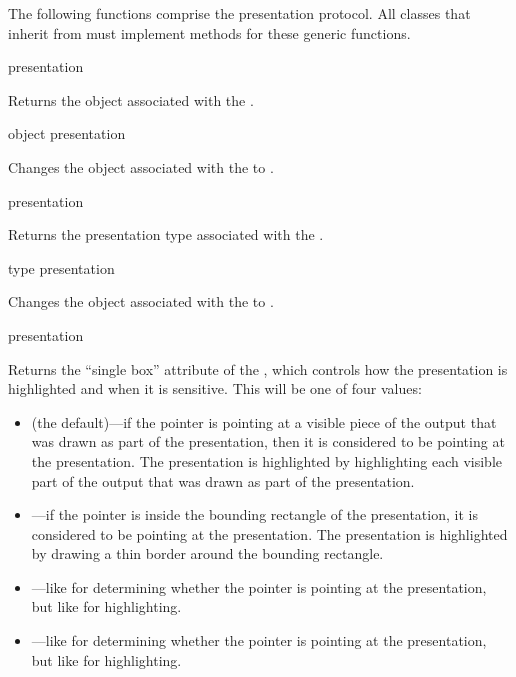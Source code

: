 The following functions comprise the presentation protocol.  All classes that
inherit from  must implement methods for these generic
functions.

 {presentation}

Returns the object associated with the  .

 {object presentation}

Changes the object associated with the   to
.

 {presentation}

Returns the presentation type associated with the 
.

 {type presentation}

Changes the object associated with the   to
.

 {presentation}

Returns the ``single box'' attribute of the 
, which controls how the presentation is highlighted and when
it is sensitive.  This will be one of four values:

\begin{itemize} 
\item {} (the default)---if the pointer is pointing at a visible piece of
the output that was drawn as part of the presentation, then it is considered to
be pointing at the presentation.  The presentation is highlighted by
highlighting each visible part of the output that was drawn as part of the
presentation.

\item {}---if the pointer is inside the bounding rectangle of the
presentation, it is considered to be pointing at the presentation.  The
presentation is highlighted by drawing a thin border around the bounding
rectangle.

\item {}---like  for determining whether the pointer is
pointing at the presentation, but like  for highlighting.

\item {}---like  for determining whether the pointer is
pointing at the presentation, but like  for highlighting.
\end{itemize}

